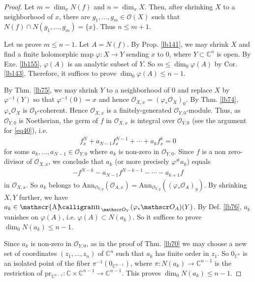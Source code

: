 \documentclass[12pt,b5paper,notitlepage]{report}
\theoremstyle{definition}
\theoremstyle{plain}
\DeclareMathOperator{\sann}{\mathscr{A}\text{\kern -3pt {\calligra\large nn}}\,}
\newcommand{\scr}{\mathscr}
\newcommand{\Cbb}{\mathbb C}
\newcommand{\pr}{\mathrm {pr}}
\newcommand{\Ann}{\mathrm{Ann}}
\numberwithin{equation}{section}
\begin{document}
\begin{proof}
Let $m=\dim_x N(f)$ and $n=\dim_xX$. Then, after shrinking $X$ to a neighborhood of $x$, there are $g_1,\dots,g_m\in\scr O(X)$ such that $N(f)\cap N(g_1,\dots,g_m)=\{x\}$.  Thus $n\leq m+1$.

Let us prove $m\leq n-1$. Let $A=N(f)$. By Prop. \ref{lb141}, we may shrink $X$ and find a finite holomorphic map $\varphi:X\rightarrow Y$ sending $x$ to $0$, where $Y\subset\Cbb^n$ is open. By Exe. \ref{lb155}, $\varphi(A)$ is an analytic subset of $Y$. So $m\leq \dim_0\varphi(A)$ by Cor. \ref{lb143}. Therefore, it suffices to prove $\dim_0\varphi(A)\leq n-1$.

By Thm. \ref{lb75}, we may shrink $Y$ to a neighborhood of $0$ and replace $X$ by $\varphi^{-1}(Y)$ so that $\varphi^{-1}(0)=x$ and hence $\scr O_{X,x}=(\varphi_*\scr O_X)_0$. By Thm. \ref{lb74}, $\varphi_*\scr O_X$ is $\scr O_Y$-coherent. Hence $\scr O_{X,x}$ is a finitely-generated $\scr O_{Y,0}$-module. Thus, as $\scr O_{Y,0}$ is Noetherian, the germ of $f$ in $\scr O_{X,x}$ is integral over $\scr O_{Y,0}$ (see the argument for \eqref{eq40}), i.e.
\begin{align*}
f_x^N+a_{N-1}f_x^{N-1}+\cdots+a_kf_x^k=0
\end{align*}
for some $a_k,\dots,a_{N-1}\in\scr O_{Y,0}$ where $a_k$ is non-zero in $\scr O_{Y,0}$. Since $f$ is a non zero-divisor of $\scr O_{X,x}$, we conclude that $a_k$ (or more precisely  $\varphi^\# a_k$) equals
\begin{align*}
-f^{N-k}-a_{N-1}f^{N-k-1}-\cdots-a_{k+1}f
\end{align*}
in $\scr O_{X,x}$. So $a_k$ belongs to $\Ann_{\scr O_{Y,y}}(\scr O_{A,x})=\Ann_{\scr O_{Y,y}}((\varphi_*\scr O_A)_y)$. By shrinking $X,Y$ further, we have $a_k\in\sann_{\scr O_Y}(\varphi_*\scr O_A)(Y)$. By Def. \ref{lb76},  $a_k$ vanishes on $\varphi(A)$, i.e. $\varphi(A)\subset N(a_k)$. So it suffices to prove $\dim_0 N(a_k)\leq n-1$.

Since $a_k$ is non-zero in $\scr O_{Y,0}$, as in the proof of Thm. \ref{lb70} we may choose a new set of coordinates $(z_1,\dots,z_n)$ of $\Cbb^n$ such that $a_k$ has finite order in $z_1$. So $0_{\Cbb^n}$ is an isolated point of the fiber $\pi^{-1}(0_{\Cbb^{n-1}})$, where $\pi:N(a_k)\rightarrow\Cbb^{n-1}$ is the restriction of $\pr_{\Cbb^{n-1}}:\Cbb\times\Cbb^{n-1}\rightarrow\Cbb^{n-1}$. This proves $\dim_0 N(a_k)\leq n-1$.
\end{proof}
\end{document}
